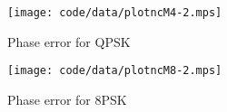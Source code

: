 \documentclass[journal]{IEEEtran}
\begin{document}


\begin{figure}[tp]
	\centering
		\texttt{[image: code/data/plotncM4-2.mps]}
		\caption{Phase error for QPSK}
		\label{fig:plotphase}
\end{figure}




\begin{figure}[tp]
	\centering
		\texttt{[image: code/data/plotncM8-2.mps]}
		\caption{Phase error for 8PSK}
		\label{fig:plotphase}
\end{figure}





\end{document}
